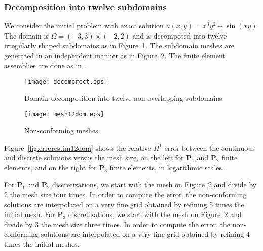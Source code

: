 \documentclass[final]{siamltex}
\begin{document}
\subsubsection{Decomposition into twelve subdomains}
\label{subsubsec:err12dom}
We consider the initial problem with  exact solution $u(x,y)=x^3y^2+\sin(xy)$.
The domain is $\Omega=(-3,3) \times (-2,2)$ and is decomposed into
twelve irregularly shaped subdomains as in Figure~\ref{fig:dec12dom}.
The subdomain meshes are generated in an
independent manner as in Figure~\ref{fig:meshnc12dom}. The finite element assemblies are done as in \cite{Cuvelier}.
\begin{figure}[H]
  \centering
   \texttt{[image: decomprect.eps]}
   \caption{Domain decomposition into twelve non-overlapping subdomains}
  \label{fig:dec12dom}
\end{figure}
\vspace*{-5mm}
\begin{figure}[H]
  \centering
   \texttt{[image: mesh12dom.eps]}
   \vspace*{-30pt}
  \caption{Non-conforming meshes}
  \label{fig:meshnc12dom}
\end{figure}
Figure~\ref{fig:errorestim12dom} shows the relative $H^1$ error between the continuous and discrete solutions
versus the mesh size, on the left for ${\mathbf{P}}_1$ and ${\mathbf{P}}_2$ finite elements, and on the right for
${\mathbf{P}}_3$ finite elements, in logarithmic scales.

For ${\mathbf{P}}_1$ and ${\mathbf{P}}_2$ discretizations,
we start with the mesh on Figure~\ref{fig:meshnc12dom} and divide by 2 the mesh size four times.
In order to compute the error, the non-conforming solutions are interpolated on a very fine
grid obtained by refining 5 times the initial mesh.
For ${\mathbf{P}}_3$ discretizations, we start with the mesh on Figure~\ref{fig:meshnc12dom} 
and divide by 3 the mesh size three times.
In order to compute the error, the non-conforming solutions are interpolated on a very fine grid obtained
by refining 4 times the initial meshes.
\end{document}
